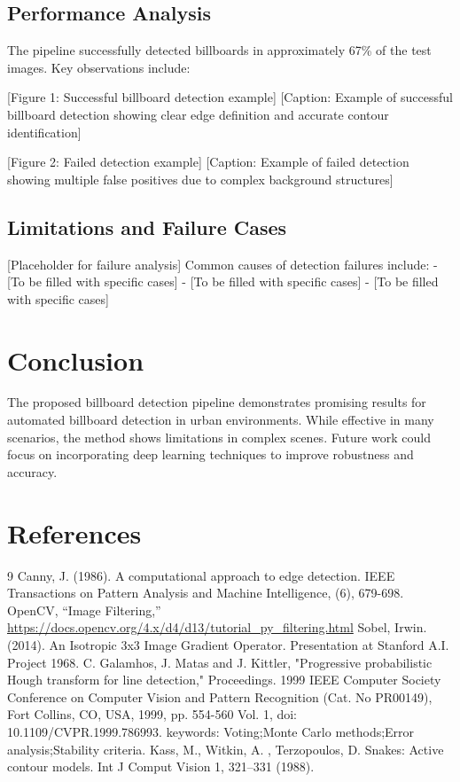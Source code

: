 \documentclass[12pt]{article}
\begin{document}
\subsection{Performance Analysis}
The pipeline successfully detected billboards in approximately 67\% of the test images. Key observations include:

[Figure 1: Successful billboard detection example]
[Caption: Example of successful billboard detection showing clear edge definition and accurate contour identification]

[Figure 2: Failed detection example]
[Caption: Example of failed detection showing multiple false positives due to complex background structures]

\subsection{Limitations and Failure Cases}
[Placeholder for failure analysis]
Common causes of detection failures include:
- [To be filled with specific cases]
- [To be filled with specific cases]
- [To be filled with specific cases]

\section{Conclusion}
The proposed billboard detection pipeline demonstrates promising results for automated billboard detection in urban environments. While effective in many scenarios, the method shows limitations in complex scenes. Future work could focus on incorporating deep learning techniques to improve robustness and accuracy.

\section{References}
\begin{thebibliography}{9}
 Canny, J. (1986). A computational approach to edge detection. IEEE Transactions on Pattern Analysis and Machine Intelligence, (6), 679-698.
 OpenCV, ``Image Filtering,''   \url{https://docs.opencv.org/4.x/d4/d13/tutorial_py_filtering.html}
Sobel, Irwin. (2014). An Isotropic 3x3 Image Gradient Operator. Presentation at Stanford A.I. Project 1968. 
 C. Galamhos, J. Matas and J. Kittler, "Progressive probabilistic Hough transform for line detection," Proceedings. 1999 IEEE Computer Society Conference on Computer Vision and Pattern Recognition (Cat. No PR00149), Fort Collins, CO, USA, 1999, pp. 554-560 Vol. 1, doi: 10.1109/CVPR.1999.786993. keywords: {Voting;Monte Carlo methods;Error analysis;Stability criteria}.
 Kass, M., Witkin, A. , Terzopoulos, D. Snakes: Active contour models. Int J Comput Vision 1, 321–331 (1988).
\end{thebibliography}
\end{document}
